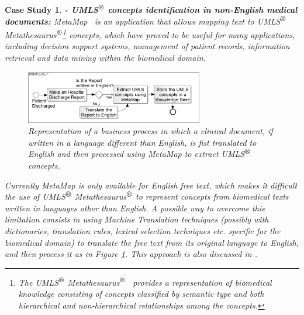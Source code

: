 \documentclass[11pt]{article}
\newtheorem{cs}{Case Study}
\begin{document}
\begin{cs}{\bf - UMLS$^{\mbox{\small\textregistered}}$ concepts identification in non-English medical documents:}
MetaMap~\citep{metamap} is an application that allows mapping text to UMLS$^{\mbox{\small\textregistered}}$ Metathesaurus$^{\mbox{\small\textregistered}}$\footnote{The UMLS$^{\mbox{\small\textregistered}}$ Metathesaurus$^{\mbox{\small\textregistered}}$~\citep{umls} provides a representation of biomedical knowledge consisting of concepts classified by semantic type and both hierarchical and non-hierarchical relationships among the concepts.} concepts, which have proved to be useful for many applications, including decision support systems, management of patient records, information retrieval and data mining within the biomedical domain.


\begin{figure}[!ht]
\begin{center}
\includegraphics[width=7.75cm]{mtsoa}
\end{center}
\caption{Representation of a business process in which a clinical document, if written in a language different than English, is fist translated to English and then processed using MetaMap to extract UMLS$^{\mbox{\small\textregistered}}$ concepts.}
\label{fig:mtsoa}
\end{figure}

Currently MetaMap is only available for English free text, which makes it difficult the use of UMLS$^{\mbox{\small\textregistered}}$ Metathesaurus$^{\mbox{\small\textregistered}}$ to represent concepts from biomedical texts written in languages other than English. A possible way to overcome this limitation consists in using Machine Translation techniques (possibly with dictionaries, translation rules, lexical selection techniques etc. specific for the biomedical domain) to translate the free text from its original language to English, and then process it as in Figure \ref{fig:mtsoa}. This approach is also discussed in .
\end{cs}
\end{document}
